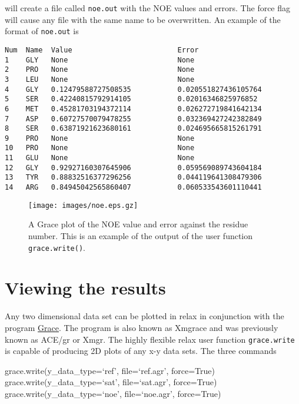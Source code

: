 
will create a file called \texttt{noe.out} with the NOE values and errors.  The force flag will cause any file with the same name to be overwritten.  An example of the format of \texttt{noe.out} is

{\footnotesize \begin{verbatim}
Num  Name  Value                         Error
1    GLY   None                          None
2    PRO   None                          None
3    LEU   None                          None
4    GLY   0.12479588727508535           0.020551827436105764
5    SER   0.42240815792914105           0.02016346825976852
6    MET   0.45281703194372114           0.026272719841642134
7    ASP   0.60727570079478255           0.032369427242382849
8    SER   0.63871921623680161           0.024695665815261791
9    PRO   None                          None
10   PRO   None                          None
11   GLU   None                          None
12   GLY   0.92927160307645906           0.059569089743604184
13   TYR   0.88832516377296256           0.044119641308479306
14   ARG   0.84945042565860407           0.060533543601110441
\end{verbatim}}




\begin{figure}
\centerline{\texttt{[image: images/noe.eps.gz]}}
\caption[NOE plot]{A Grace plot of the NOE value and error against the residue number.  This is an example of the output of the user function \texttt{grace.write()}.}\label{fig: NOE plot}
\end{figure}


\section{Viewing the results}

Any two dimensional data set can be plotted in relax in conjunction with the program \href{http://plasma-gate.weizmann.ac.il/Grace/}{Grace}.  The program is also known as Xmgrace and was previously known as ACE/gr or Xmgr.  The highly flexible relax user function \texttt{grace.write} is capable of producing 2D plots of any x-y data sets.  The three commands

\begin{exampleenv}
grace.write(y\_data\_type=`ref', file=`ref.agr', force=True) \\
grace.write(y\_data\_type=`sat', file=`sat.agr', force=True) \\
grace.write(y\_data\_type=`noe', file=`noe.agr', force=True)
\end{exampleenv}

